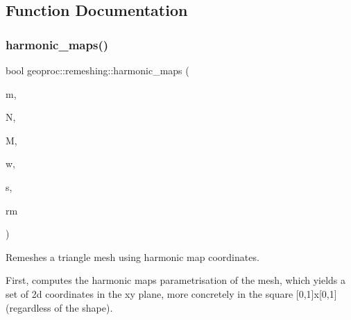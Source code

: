 \subsection{Function Documentation}
\mbox{\label{namespacegeoproc_1_1remeshing_a5ed68eab2cd304f825321c46cdcdc17e}} 
\subsubsection{\texorpdfstring{harmonic\+\_\+maps()}{harmonic\_maps()}\hspace{0.1cm}{\footnotesize\ttfamily [1/2]}}
{\footnotesize\ttfamily bool geoproc\+::remeshing\+::harmonic\+\_\+maps (\begin{DoxyParamCaption}\item[{const \hyperlink{classgeoproc_1_1TriangleMesh}{Triangle\+Mesh} \&}]{m,  }\item[{size\+\_\+t}]{N,  }\item[{size\+\_\+t}]{M,  }\item[{const \hyperlink{namespacegeoproc_a12e5a10581b53b9dd9a509127527f843}{weight} \&}]{w,  }\item[{const \hyperlink{namespacegeoproc_a494da744a805b80f842402f0a806ccfc}{boundary\+\_\+shape} \&}]{s,  }\item[{\hyperlink{classgeoproc_1_1TriangleMesh}{Triangle\+Mesh} \&}]{rm }\end{DoxyParamCaption})}



Remeshes a triangle mesh using harmonic map coordinates. 

First, computes the harmonic maps parametrisation of the mesh, which yields a set of 2d coordinates in the xy plane, more concretely in the square \mbox{[}0,1\mbox{]}x\mbox{[}0,1\mbox{]} (regardless of the shape).

